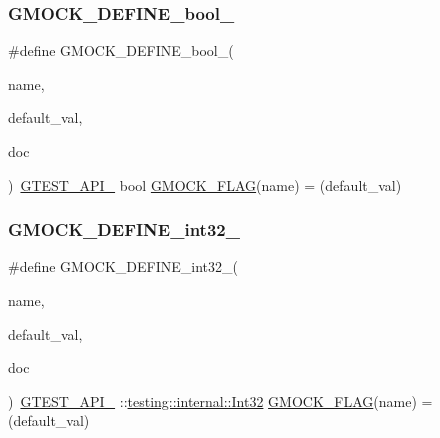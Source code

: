\mbox{\label{googletest-master_2googlemock_2include_2gmock_2internal_2gmock-port_8h_a470be328fabbeef3987127adc18a1433}} 
\subsubsection{\texorpdfstring{GMOCK\_DEFINE\_bool\_}{GMOCK\_DEFINE\_bool\_}}
{\footnotesize\ttfamily \#define G\+M\+O\+C\+K\+\_\+\+D\+E\+F\+I\+N\+E\+\_\+bool\+\_\+(\begin{DoxyParamCaption}\item[{}]{name,  }\item[{}]{default\+\_\+val,  }\item[{}]{doc }\end{DoxyParamCaption})~\mbox{\hyperlink{_obj__test_2lib_2googletest-release-1_88_81_2googletest_2include_2gtest_2internal_2gtest-port_8h_aa73be6f0ba4a7456180a94904ce17790}{G\+T\+E\+S\+T\+\_\+\+A\+P\+I\+\_\+}} bool \mbox{\hyperlink{_obj__test_2lib_2googletest-release-1_88_81_2googlemock_2include_2gmock_2internal_2gmock-port_8h_ad7119adfef06be5e7b1551633f5a1436}{G\+M\+O\+C\+K\+\_\+\+F\+L\+AG}}(name) = (default\+\_\+val)}

\mbox{\label{googletest-master_2googlemock_2include_2gmock_2internal_2gmock-port_8h_a19d91081ff0aaab2f60ef1dc2d6e6b34}} 
\subsubsection{\texorpdfstring{GMOCK\_DEFINE\_int32\_}{GMOCK\_DEFINE\_int32\_}}
{\footnotesize\ttfamily \#define G\+M\+O\+C\+K\+\_\+\+D\+E\+F\+I\+N\+E\+\_\+int32\+\_\+(\begin{DoxyParamCaption}\item[{}]{name,  }\item[{}]{default\+\_\+val,  }\item[{}]{doc }\end{DoxyParamCaption})~\mbox{\hyperlink{_obj__test_2lib_2googletest-release-1_88_81_2googletest_2include_2gtest_2internal_2gtest-port_8h_aa73be6f0ba4a7456180a94904ce17790}{G\+T\+E\+S\+T\+\_\+\+A\+P\+I\+\_\+}} \+::\mbox{\hyperlink{namespacetesting_1_1internal_af89e21e4043b5cf0c120af487b24fa06}{testing\+::internal\+::\+Int32}} \mbox{\hyperlink{_obj__test_2lib_2googletest-release-1_88_81_2googlemock_2include_2gmock_2internal_2gmock-port_8h_ad7119adfef06be5e7b1551633f5a1436}{G\+M\+O\+C\+K\+\_\+\+F\+L\+AG}}(name) = (default\+\_\+val)}

